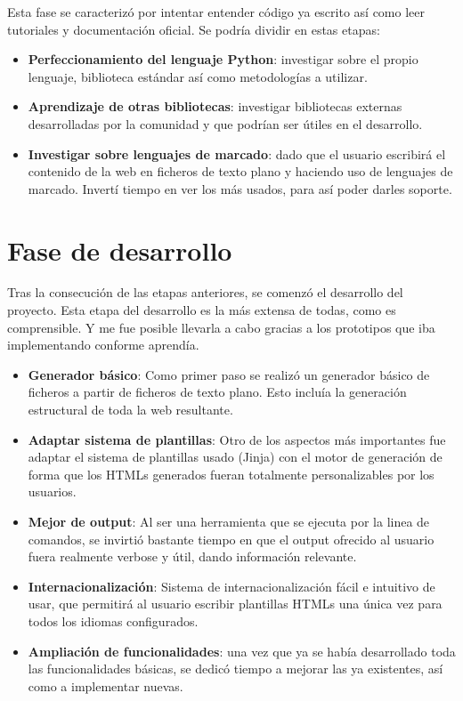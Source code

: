 Esta fase se caracterizó por intentar entender código ya escrito así como leer tutoriales y documentación
oficial. Se podría dividir en estas etapas:

\begin{itemize}
\item \textbf{Perfeccionamiento del lenguaje Python}: investigar sobre el propio lenguaje, biblioteca estándar
así como metodologías a utilizar.
\item \textbf{Aprendizaje de otras bibliotecas}: investigar bibliotecas externas desarrolladas por la comunidad y
que podrían ser útiles en el desarrollo.
\item \textbf{Investigar sobre lenguajes de marcado}: dado que el usuario escribirá el contenido de la web en ficheros
de texto plano y haciendo uso de lenguajes de marcado. Invertí tiempo en ver los más usados, para así poder
darles soporte.
\end{itemize}

\section{Fase de desarrollo}

Tras la consecución de las etapas anteriores, se comenzó el desarrollo del proyecto. Esta etapa del desarrollo 
es la más extensa de todas, como es comprensible. Y me fue posible llevarla a cabo gracias a los
prototipos que iba implementando conforme aprendía.

\begin{itemize}
\item \textbf{Generador básico}: Como primer paso se realizó un generador básico de ficheros a partir 
de ficheros de texto plano. Esto incluía la generación estructural de toda la web resultante.
\item \textbf{Adaptar sistema de plantillas}: Otro de los aspectos más importantes fue adaptar el sistema 
de plantillas usado (Jinja) con el motor de generación de forma que los HTMLs generados fueran totalmente
personalizables por los usuarios.
\item \textbf{Mejor de output}: Al ser una herramienta que se ejecuta por la linea de comandos, se invirtió
bastante tiempo en que el output ofrecido al usuario fuera realmente verbose y útil, dando información relevante.
\item \textbf{Internacionalización}: Sistema de internacionalización fácil e intuitivo de usar, que permitirá al usuario
escribir plantillas HTMLs una única vez para todos los idiomas configurados.
\item \textbf{Ampliación de funcionalidades}: una vez que ya se había desarrollado toda las funcionalidades básicas,
se dedicó tiempo a mejorar las ya existentes, así como a implementar nuevas.
\end{itemize}


